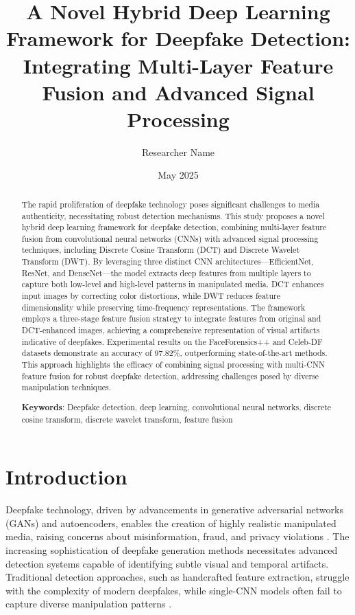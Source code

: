 \documentclass[12pt]{article}
\begin{document}
\title{A Novel Hybrid Deep Learning Framework for Deepfake Detection: Integrating Multi-Layer Feature Fusion and Advanced Signal Processing}
\author{Researcher Name}
\date{May 2025}
\maketitle

\begin{abstract}
The rapid proliferation of deepfake technology poses significant challenges to media authenticity, necessitating robust detection mechanisms. This study proposes a novel hybrid deep learning framework for deepfake detection, combining multi-layer feature fusion from convolutional neural networks (CNNs) with advanced signal processing techniques, including Discrete Cosine Transform (DCT) and Discrete Wavelet Transform (DWT). By leveraging three distinct CNN architectures—EfficientNet, ResNet, and DenseNet—the model extracts deep features from multiple layers to capture both low-level and high-level patterns in manipulated media. DCT enhances input images by correcting color distortions, while DWT reduces feature dimensionality while preserving time-frequency representations. The framework employs a three-stage feature fusion strategy to integrate features from original and DCT-enhanced images, achieving a comprehensive representation of visual artifacts indicative of deepfakes. Experimental results on the FaceForensics++ and Celeb-DF datasets demonstrate an accuracy of 97.82\%, outperforming state-of-the-art methods. This approach highlights the efficacy of combining signal processing with multi-CNN feature fusion for robust deepfake detection, addressing challenges posed by diverse manipulation techniques.

\textbf{Keywords}: Deepfake detection, deep learning, convolutional neural networks, discrete cosine transform, discrete wavelet transform, feature fusion
\end{abstract}

\tableofcontents
\newpage

\section{Introduction}
Deepfake technology, driven by advancements in generative adversarial networks (GANs) and autoencoders, enables the creation of highly realistic manipulated media, raising concerns about misinformation, fraud, and privacy violations \citep{rossler2019faceforensics}. The increasing sophistication of deepfake generation methods necessitates advanced detection systems capable of identifying subtle visual and temporal artifacts. Traditional detection approaches, such as handcrafted feature extraction, struggle with the complexity of modern deepfakes, while single-CNN models often fail to capture diverse manipulation patterns \citep{mirsky2021creation}.
\end{document}

